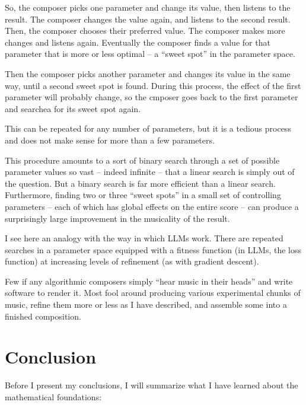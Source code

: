 \documentclass[]{interact}
\theoremstyle{plain}%
\theoremstyle{definition}
\theoremstyle{remark}
\begin{document}
So, the composer picks one parameter and change its value, then listens to the result. The composer changes the value again, and listens to the second result. Then, the composer chooses their preferred value. The composer makes more changes and listens again. Eventually the composer finds a value for that parameter that is more or less optimal – a ``sweet spot'' in the parameter space.

Then the composer picks another parameter and changes its value in the same way, until a second sweet spot is found. During this process, the effect of the first parameter will probably change, so the cmposer goes back to the first parameter and searchea for its sweet spot again.

This can be repeated for any number of parameters, but it is a tedious process and does not make sense for more than a few parameters.

This procedure amounts to a sort of binary search through a set of possible parameter values so vast – indeed infinite – that a linear search is simply out of the question. But a binary search is far more efficient than a linear search. Furthermore, finding two or three ``sweet spots'' in a small set of controlling parameters – each of which has global effects on the entire score – can produce a surprisingly large improvement in the musicality of the result.

I see here an analogy with the way in which LLMs work. There are repeated searches in a parameter space equipped with a fitness function (in LLMs, the loss function) at increasing levels of refinement (as with gradient descent).

Few if any algorithmic composers simply ``hear music in their heads'' and write software to render it. Most fool around producing various experimental chunks of music, refine them more or less as I have described, and assemble some into a finished composition.

\section{Conclusion}

Before I present my conclusions, I will summarize what I have learned about the mathematical foundations:
\end{document}
